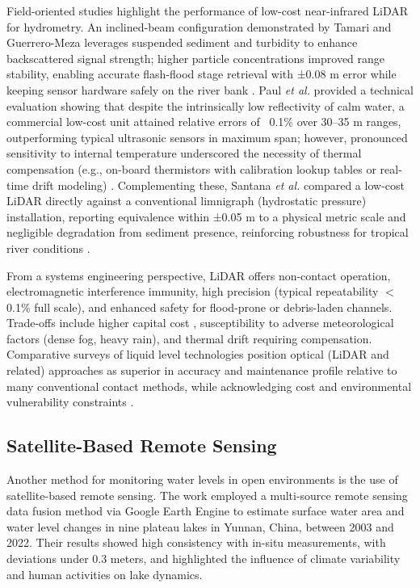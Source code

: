 \documentclass[conference]{IEEEtran}
\begin{document}
Field-oriented studies highlight the performance of low-cost near-infrared LiDAR for hydrometry. An inclined-beam configuration demonstrated by Tamari and Guerrero-Meza leverages suspended sediment and turbidity to enhance backscattered signal strength; higher particle concentrations improved range stability, enabling accurate flash-flood stage retrieval with ±0.08 m error while keeping sensor hardware safely on the river bank \cite{tamari_2016_flash}. Paul \textit{et al.} provided a technical evaluation showing that despite the intrinsically low reflectivity of calm water, a commercial low-cost unit attained relative errors of ~0.1\% over 30–35 m ranges, outperforming typical ultrasonic sensors in maximum span; however, pronounced sensitivity to internal temperature underscored the necessity of thermal compensation (e.g., on-board thermistors with calibration lookup tables or real-time drift modeling) \cite{paul_2020_a}. Complementing these, Santana \textit{et al.} compared a low-cost LiDAR directly against a conventional limnigraph (hydrostatic pressure) installation, reporting equivalence within ±0.05 m to a physical metric scale and negligible degradation from sediment presence, reinforcing robustness for tropical river conditions \cite{santana_2024_development}.

From a systems engineering perspective, LiDAR offers non-contact operation, electromagnetic interference immunity, high precision (typical repeatability $<$0.1\% full scale), and enhanced safety for flood-prone or debris-laden channels. Trade-offs include higher capital cost , susceptibility to adverse meteorological factors (dense fog, heavy rain), and thermal drift requiring compensation. Comparative surveys of liquid level technologies position optical (LiDAR and related) approaches as superior in accuracy and maintenance profile relative to many conventional contact methods, while acknowledging cost and environmental vulnerability constraints \cite{singh_2018_review}.

\subsection{Satellite-Based Remote Sensing}

Another method for monitoring water levels in open environments is the use of satellite-based remote sensing. The work \cite{jiang_2024_monitoring} employed a multi-source remote sensing data fusion method via Google Earth Engine to estimate surface water area and water level changes in nine plateau lakes in Yunnan, China, between 2003 and 2022. Their results showed high consistency with in-situ measurements, with deviations under 0.3 meters, and highlighted the influence of climate variability and human activities on lake dynamics.
\end{document}
